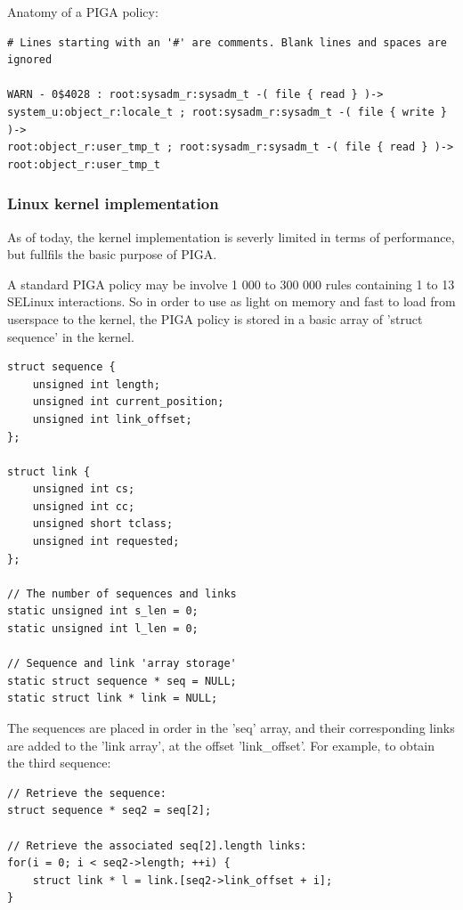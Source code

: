 \documentclass[pdftex,a4paper,titlepage,11pt]{article}
\begin{document}
Anatomy of a PIGA policy:

\begin{lstlisting}
# Lines starting with an '#' are comments. Blank lines and spaces are ignored

WARN - 0$4028 : root:sysadm_r:sysadm_t -( file { read } )->
system_u:object_r:locale_t ; root:sysadm_r:sysadm_t -( file { write } )->
root:object_r:user_tmp_t ; root:sysadm_r:sysadm_t -( file { read } )->
root:object_r:user_tmp_t
\end{lstlisting}


\subsubsection{Linux kernel implementation}

As of today, the kernel implementation is severly limited in terms of
performance, but fullfils the basic purpose of PIGA.

\bigskip

A standard PIGA policy may be involve 1 000 to 300 000 rules containing 1 to 13
SELinux interactions. So in order to use as light on memory and fast to load
from userspace to the kernel, the PIGA policy is stored in a basic array of
'struct sequence' in the kernel.

\begin{lstlisting}
struct sequence {
	unsigned int length;
	unsigned int current_position;
	unsigned int link_offset;
};

struct link {
	unsigned int cs;
	unsigned int cc;
	unsigned short tclass;
	unsigned int requested;
};

// The number of sequences and links
static unsigned int s_len = 0;
static unsigned int l_len = 0;

// Sequence and link 'array storage'
static struct sequence * seq = NULL;
static struct link * link = NULL;
\end{lstlisting}

\smallskip

The sequences are placed in order in the 'seq' array, and their corresponding
links are added to the 'link array', at the offset 'link\_offset'. For example,
to obtain the third sequence:

\begin{lstlisting}
// Retrieve the sequence:
struct sequence * seq2 = seq[2];

// Retrieve the associated seq[2].length links:
for(i = 0; i < seq2->length; ++i) {
	struct link * l = link.[seq2->link_offset + i];
}
\end{lstlisting}
\end{document}
